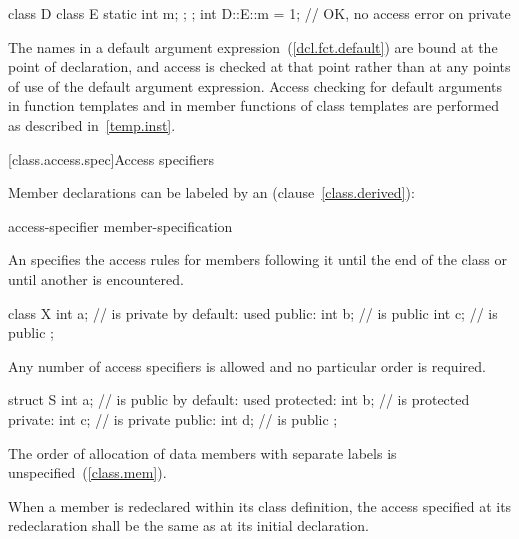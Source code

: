 \begin{codeblock}
class D {
    class E {
	static int m;
    };
};
int D::E::m = 1;		// OK, no access error on private 
\end{codeblock}

\exitexampleb

\pnum
{}%
%
The names in a default argument expression~(\ref{dcl.fct.default}) are
bound at the point of declaration, and access is checked at that
point rather than at any points of use of the default argument expression.
Access checking for default arguments in function templates and in
member functions of class templates are performed as described in~\ref{temp.inst}.

[class.access.spec]{Access specifiers}%

\pnum
Member declarations can be labeled by an
(clause~\ref{class.derived}):

\begin{ncbnftab}
access-specifier \terminal{:} member-specification\opt
\end{ncbnftab}

An
specifies the access rules for members following it
until the end of the class or until another
is encountered.
\enterexample

\begin{codeblock}
class X {
    int a;			//  is private by default:  used
public:
    int b;			//  is public
    int c;			//  is public
};
\end{codeblock}
\exitexampleb
Any number of access specifiers is allowed and no particular order is required.
\enterexample

\begin{codeblock}
struct S {
    int a;			//  is public by default:  used
protected:
    int b;			//  is protected
private:
    int c;			//  is private
public:
    int d;			//  is public
};
\end{codeblock}
\exitexampleb

\pnum
The order of allocation of data members with separate
 labels is unspecified~(\ref{class.mem}).

\pnum
When a member is redeclared within its class definition,
the access specified at its redeclaration shall
be the same as at its initial declaration.
\enterexample

